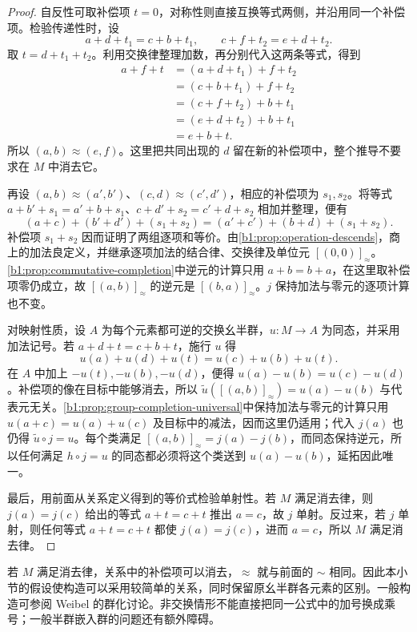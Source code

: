 \begin{proof}
	自反性可取补偿项 \(t=0\)，对称性则直接互换等式两侧，并沿用同一个补偿项。检验传递性时，设
	\[
		a+d+t_1=c+b+t_1,\qquad c+f+t_2=e+d+t_2.
	\]
	取 \(t=d+t_1+t_2\)。利用交换律整理加数，再分别代入这两条等式，得到
	\[
		\begin{aligned}
			a+f+t&=(a+d+t_1)+f+t_2\\
			&=(c+b+t_1)+f+t_2\\
			&=(c+f+t_2)+b+t_1\\
			&=(e+d+t_2)+b+t_1\\
			&=e+b+t.
		\end{aligned}
	\]
	所以 \((a,b)\approx(e,f)\)。这里把共同出现的 \(d\) 留在新的补偿项中，整个推导不要求在 \(M\) 中消去它。

	再设 \((a,b)\approx(a',b')\)、\((c,d)\approx(c',d')\)，相应的补偿项为 \(s_1,s_2\)。将等式 \(a+b'+s_1=a'+b+s_1\)、\(c+d'+s_2=c'+d+s_2\) 相加并整理，便有
	\[
		(a+c)+(b'+d')+(s_1+s_2) =(a'+c')+(b+d)+(s_1+s_2).
	\]
	补偿项 \(s_1+s_2\) 因而证明了两组逐项和等价。由\cref{b1:prop:operation-descends}，商上的加法良定义，并继承逐项加法的结合律、交换律及单位元 \([(0,0)]_{\approx}\)。\cref{b1:prop:commutative-completion}中逆元的计算只用 \(a+b=b+a\)，在这里取补偿项零仍成立，故 \([(a,b)]_{\approx}\) 的逆元是 \([(b,a)]_{\approx}\)。\(j\) 保持加法与零元的逐项计算也不变。

	对映射性质，设 \(A\) 为每个元素都可逆的交换幺半群，\(u:M\rightarrow A\) 为同态，并采用加法记号。若 \(a+d+t=c+b+t\)，施行 \(u\) 得
	\[
		u(a)+u(d)+u(t)=u(c)+u(b)+u(t).
	\]
	在 \(A\) 中加上 \(-u(t),-u(b),-u(d)\)，便得 \(u(a)-u(b)=u(c)-u(d)\)。补偿项的像在目标中能够消去，所以 \(\widetilde u([(a,b)]_{\approx})=u(a)-u(b)\) 与代表元无关。\cref{b1:prop:group-completion-universal}中保持加法与零元的计算只用 \(u(a+c)=u(a)+u(c)\) 及目标中的减法，因而这里仍适用；代入 \(j(a)\) 也仍得 \(\widetilde u\circ j=u\)。每个类满足 \([(a,b)]_{\approx}=j(a)-j(b)\)，而同态保持逆元，所以任何满足 \(h\circ j=u\) 的同态都必须将这个类送到 \(u(a)-u(b)\)，延拓因此唯一。

	最后，用前面从关系定义得到的等价式检验单射性。若 \(M\) 满足消去律，则 \(j(a)=j(c)\) 给出的等式 \(a+t=c+t\) 推出 \(a=c\)，故 \(j\) 单射。反过来，若 \(j\) 单射，则任何等式 \(a+t=c+t\) 都使 \(j(a)=j(c)\)，进而 \(a=c\)，所以 \(M\) 满足消去律。
\end{proof}

若 \(M\) 满足消去律，关系中的补偿项可以消去，\(\approx\) 就与前面的 \(\sim\) 相同。因此本小节的假设使构造可以采用较简单的关系，同时保留原幺半群各元素的区别。一般构造可参阅 Weibel 的群化讨论\cite[Chapter II, \S~1, Corollary 1.2]{Weibel2013KBook}。非交换情形不能直接把同一公式中的加号换成乘号；一般半群嵌入群的问题还有额外障碍。
